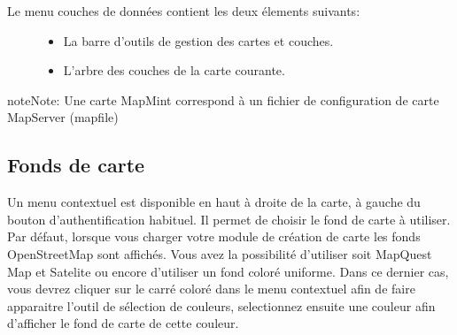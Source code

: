 \documentclass[letterpaper,10pt,french]{sphinxmanual}
\begin{document}
\begin{description}
\item[{Le menu couches de données contient les deux élements suivants:}] \leavevmode\begin{itemize}
\item {} 
La barre d'outils de gestion des cartes et couches.

\item {} 
L'arbre des couches de la carte courante.

\end{itemize}

\end{description}

\begin{notice}{note}{Note:}
Une carte MapMint correspond à un fichier de configuration de carte MapServer (mapfile)
\end{notice}


\subsection{Fonds de carte}
\label{maps/layerstree:fonds-de-carte}
Un menu contextuel est disponible en haut à droite de la carte, à
gauche du bouton d'authentification habituel. Il permet de choisir le
fond de carte à utiliser. Par défaut, lorsque vous charger votre
module de création de carte les fonds OpenStreetMap sont
affichés. Vous avez la possibilité d'utiliser soit MapQuest Map et
Satelite ou encore d'utiliser un fond coloré uniforme. Dans ce dernier
cas, vous devrez cliquer sur le carré coloré dans le menu contextuel
afin de faire apparaitre l'outil de sélection de couleurs,
selectionnez ensuite une couleur afin d'afficher le fond de carte de
cette couleur.

\end{document}
